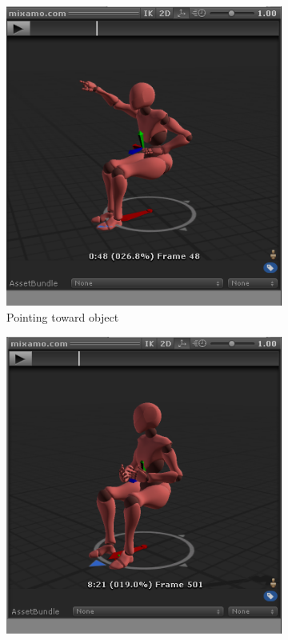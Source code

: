 \documentclass[18pt]{article}
\numberwithin{equation}{section} %
\numberwithin{figure}{section} %
\numberwithin{table}{section} %
\begin{document}
\begin{figure}[H]
\begin{subfigure}{0.2\textwidth}
				\includegraphics[width=0.96\linewidth]{images/sit_point}
				\caption{Pointing toward object}
			\end{subfigure}		
			\begin{subfigure}{0.2\textwidth}
				\centering
				\includegraphics[width=0.96\linewidth]{images/sit_talk}

\end{subfigure}
\end{figure}
\end{document}
